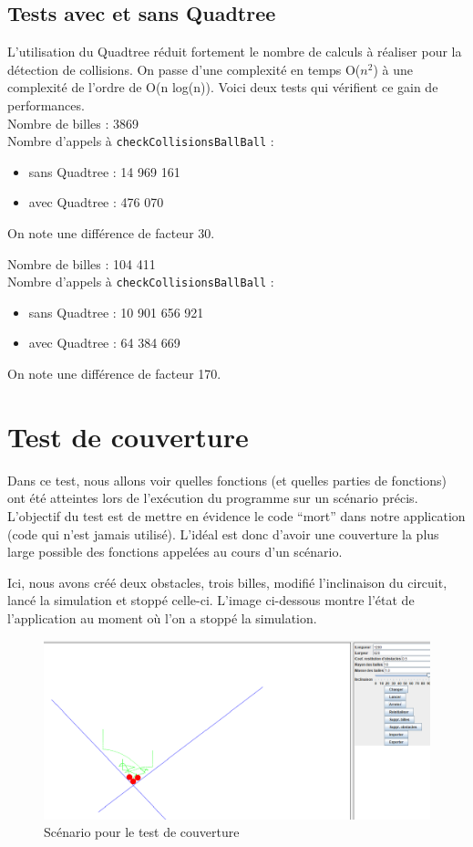 \documentclass{report}
\begin{document}
\subsection{Tests avec et sans Quadtree}

L’utilisation du Quadtree réduit fortement le nombre de calculs à réaliser pour la détection de collisions. On passe d’une complexité en temps O(\(n^2\)) à une complexité de l’ordre de O(n log(n)). Voici deux tests qui vérifient ce gain de performances. \\

Nombre de billes : 3869\\

Nombre d’appels à \texttt{checkCollisionsBallBall} :
\begin{itemize}
\item sans Quadtree : 14 969 161
\item avec Quadtree : 476 070
\end{itemize}
On note une différence de facteur 30.

Nombre de billes : 104 411\\

Nombre d’appels à \texttt{checkCollisionsBallBall} :
\begin{itemize}
\item sans Quadtree : 10 901 656 921
\item avec Quadtree : 64 384 669
\end{itemize}
On note une différence de facteur 170.

\newpage
\section{Test de couverture}

Dans ce test, nous allons voir quelles fonctions (et quelles parties de fonctions) ont été atteintes lors de l’exécution du programme sur un scénario précis. L’objectif du test est de mettre en évidence le code “mort” dans notre application (code qui n’est jamais utilisé). L’idéal est donc d’avoir une couverture la plus large possible des fonctions appelées au cours d’un scénario.

Ici, nous avons créé deux obstacles, trois billes, modifié l’inclinaison du circuit, lancé la simulation et stoppé celle-ci. L’image ci-dessous montre l’état de l’application au moment où l’on a stoppé la simulation.


\begin{figure}[H]
\centering
\includegraphics[scale=0.8]{cas_cov.png}
\caption{Scénario pour le test de couverture}
\end{figure}
\end{document}
